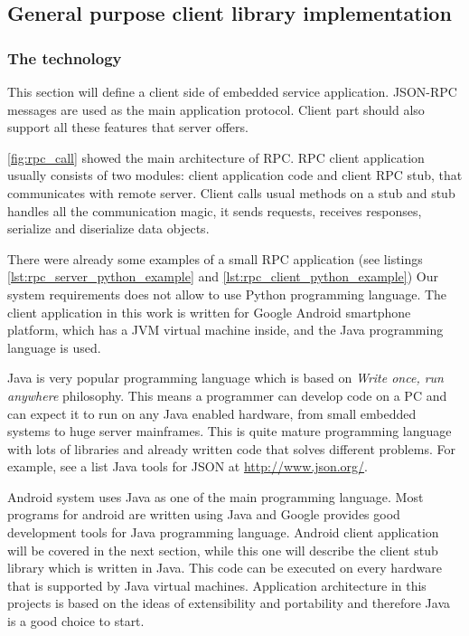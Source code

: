 \newpage
\subsection{General purpose client library implementation}

\subsubsection{The technology}
This section will define a client side of embedded service application.
JSON-RPC messages are used as the main application protocol.
Client part should also support all these features that server offers.

\autoref{fig:rpc_call} showed the main architecture of RPC.
RPC client   application usually consists of two modules: client application code
and client RPC stub, that communicates with remote server.
Client calls usual methods on a stub and stub handles all
the communication magic, it sends requests, receives responses, serialize and
diserialize data objects.

There were already some examples of a small RPC application (see listings
\ref{lst:rpc_server_python_example} and
\ref{lst:rpc_client_python_example})
Our system requirements does not allow to use Python programming language.
The client application in this work is written for Google Android smartphone
platform, which has a \gls{JVM} virtual machine inside, and the Java programming
language is used.

Java is very popular programming language which is based on \textit{Write once,
run anywhere} philosophy. This means a programmer can develop code on a PC and
can expect it to run on any Java enabled hardware, from small embedded systems
to huge server mainframes. 
This is quite mature programming language with lots of libraries and already
written code that solves different problems. For example, see a list Java tools
for JSON at \url{http://www.json.org/}.

Android system uses Java as one of the main programming language. 
Most programs for android are written using Java and Google provides good
development tools for Java programming language.
Android client application will be covered in the next section, while this one will describe the client
stub library which is written in Java. 
This code can be executed on every hardware that is supported by Java virtual
machines. Application architecture in this projects is based on the ideas of
extensibility and portability and therefore Java is a good choice to start.

